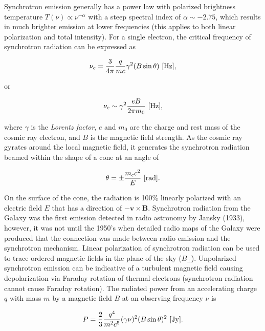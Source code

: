 \documentclass[a4paper,10pt]{article}
\begin{document}
{\noindent}Synchrotron emission generally has a power law with polarized brightness temperature $T(\nu)\propto\nu^{-\alpha}$ with a steep spectral index of $\alpha\sim-2.75$, which results in much brighter emission at lower frequencies (this applies to both linear polarization and total intensity). For a single electron, the critical frequency of synchrotron radiation can be expressed as

\begin{align*}
    \nu_c = \dfrac{3}{4\pi}\dfrac{q}{mc}\gamma^2(B\sin\theta)~[{\rm Hz}],
\end{align*}

{\noindent} or

\begin{align*}
\nu_c \sim \gamma^2 \frac{eB}{2\pi m_0} ~ [{\rm Hz}],
\end{align*}

{\noindent}where $\gamma$ is the \textit{Lorentz factor}, $e$ and $m_0$ are the charge and rest mass of the cosmic ray electron, and $B$ is the magnetic field strength. As the cosmic ray gyrates around the local magnetic field, it generates the synchrotron radiation beamed within the shape of a cone at an angle of 

\begin{align*}
    \theta = \pm \frac{m_cc^2}{E} ~ [{\rm rad}].
\end{align*}

{\noindent}On the surface of the cone, the radiation is 100\% linearly polarized with an electric field $E$ that has a direction of $-\mathbf{v\times B}$. Synchrotron radiation from the Galaxy was the first emission detected in radio astronomy by Jansky (1933), however, it was not until the 1950's when detailed radio maps of the Galaxy were produced that the connection was made between radio emission and the synchrotron mechanism. Linear polarization of synchrotron radiation can be used to trace ordered magnetic fields in the plane of the sky ($B_\perp$). Unpolarized synchrotron emission can be indicative of a turbulent magnetic field causing depolarization via Faraday rotation of thermal electrons (synchrotron radiation cannot cause Faraday rotation). The radiated power from an accelerating charge $q$ with mass $m$ by a magnetic field $B$ at an observing frequency $\nu$ is

\begin{align*}
    P = \frac{2}{3}\dfrac{q^4}{m^2c^5}(\gamma\nu)^2(B\sin\theta)^2 ~ [{\rm Jy}].
\end{align*}
\end{document}
